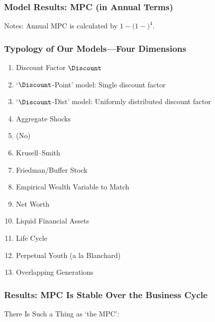 \documentclass{beamer}
\newcommand{\jemph}[1]{{\color{jirkasred}#1}}
\begin{document}
\begin{frame}
\frametitle{{Model Results: MPC (in Annual Terms)}}
\begin{tiny}
\begin{table}

\end{table}
\tiny{Notes: Annual MPC is calculated by $1-(1-$$)^{4}$.
}
\end{tiny}
\end{frame}



\begin{frame}
\frametitle{{Typology of Our Models---{Four Dimensions}}}

\begin{block}{}\footnotesize
\begin{enumerate}
\item<0-0> \jemph{Discount Factor $\Discount$}
\bi \scriptsize
\item \jemph{`$\Discount$-Point' model:} Single discount factor
\item \jemph{`$\Discount$-Dist' model:} Uniformly distributed discount factor
\ei
\item<1-> \jemph{Aggregate Shocks}
\bi \scriptsize
\item (No)
\item Krusell--Smith
\item Friedman/Buffer Stock
\ei
\item<0-0> \jemph{Empirical Wealth Variable to Match}
\bi \scriptsize
\item Net Worth
\item Liquid Financial Assets
\ei
\item<0-0> \jemph{Life Cycle}
\bi \scriptsize
\item Perpetual Youth (a la Blanchard)
\item Overlapping Generations
\ei
\end{enumerate}
\end{block}

\end{frame}




\begin{frame}
\frametitle{{Results: MPC Is Stable Over the Business Cycle}}
There Is Such a Thing as `the MPC':
\begin{tiny}
\begin{table}

\end{table}
\end{tiny}
\end{frame}
\end{document}
